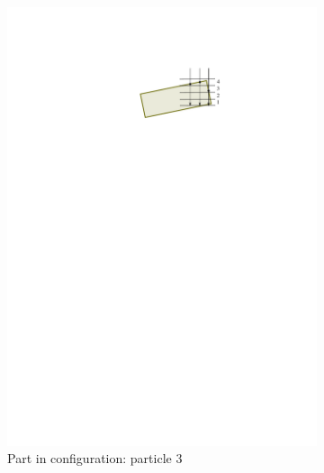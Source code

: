 \documentclass[letterpaper, 10 pt, conference]{ieeeconf}
\begin{document}
\begin{figure}
\begin{subfigure}[b]{0.2\linewidth}
        \includegraphics[width=\textwidth, clip, trim=4.2in 8.4in 2.5in 1.7in]{bins_p3}
        \caption{Part in configuration: particle 3}
        \label{bins:p3}
    \end{subfigure}
    \hfill
    \begin{subfigure}[b]{0.38\linewidth}

\end{subfigure}
\end{figure}
\end{document}
